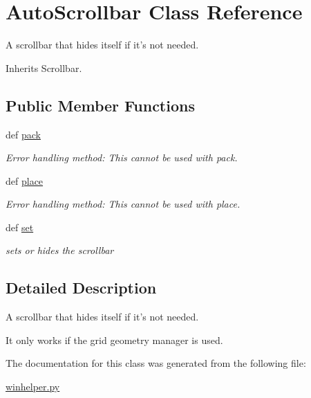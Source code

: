 \hypertarget{classgui_1_1winhelper_1_1AutoScrollbar}{\section{Auto\-Scrollbar Class Reference}
\label{classgui_1_1winhelper_1_1AutoScrollbar}
}


A scrollbar that hides itself if it's not needed.  




Inherits Scrollbar.

\subsection*{Public Member Functions}
\begin{DoxyCompactItemize}
\item 
\hypertarget{classgui_1_1winhelper_1_1AutoScrollbar_a494d5f53d3838090fc7841e90067e546}{def \hyperlink{classgui_1_1winhelper_1_1AutoScrollbar_a494d5f53d3838090fc7841e90067e546}{pack}}\label{classgui_1_1winhelper_1_1AutoScrollbar_a494d5f53d3838090fc7841e90067e546}

\begin{DoxyCompactList}\small\item\em Error handling method\-: This cannot be used with pack. \end{DoxyCompactList}\item 
\hypertarget{classgui_1_1winhelper_1_1AutoScrollbar_af53c142c14b9325d4c0ce56e8b230701}{def \hyperlink{classgui_1_1winhelper_1_1AutoScrollbar_af53c142c14b9325d4c0ce56e8b230701}{place}}\label{classgui_1_1winhelper_1_1AutoScrollbar_af53c142c14b9325d4c0ce56e8b230701}

\begin{DoxyCompactList}\small\item\em Error handling method\-: This cannot be used with place. \end{DoxyCompactList}\item 
\hypertarget{classgui_1_1winhelper_1_1AutoScrollbar_a621bd5e22d03cc48dbb784427b1c0fd8}{def \hyperlink{classgui_1_1winhelper_1_1AutoScrollbar_a621bd5e22d03cc48dbb784427b1c0fd8}{set}}\label{classgui_1_1winhelper_1_1AutoScrollbar_a621bd5e22d03cc48dbb784427b1c0fd8}

\begin{DoxyCompactList}\small\item\em sets or hides the scrollbar \end{DoxyCompactList}\end{DoxyCompactItemize}


\subsection{Detailed Description}
A scrollbar that hides itself if it's not needed. 

It only works if the grid geometry manager is used. 

The documentation for this class was generated from the following file\-:\begin{DoxyCompactItemize}
\item 
\hyperlink{winhelper_8py}{winhelper.\-py}\end{DoxyCompactItemize}
